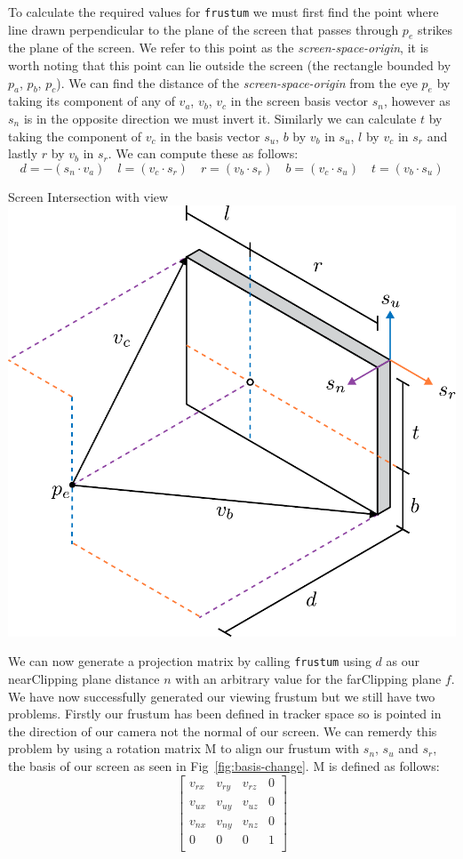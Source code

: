 To calculate the required values for \texttt{frustum} we must first find the point where line drawn perpendicular to the plane of the screen that passes through $p_e$ strikes the plane of the screen. We refer to this point as the {\it screen-space-origin}, it is worth noting that this point can lie outside the screen (the rectangle bounded by $p_a$, $p_b$, $p_c$). We can find the distance of the {\it screen-space-origin} from the eye $p_e$ by taking its component of any of $v_a$, $v_b$, $v_c$ in the screen basis vector $s_n$, however as $s_n$ is in the opposite direction we must invert it. Similarly we can calculate $t$ by taking the component of $v_c$ in the basis vector $s_u$, $b$ by $v_b$ in $s_u$, $l$ by $v_c$ in $s_r$ and lastly $r$ by $v_b$ in $s_r$. We can compute these as follows:
\[ d= -(s_n \cdot v_a) \quad l = (v_c \cdot s_r) \quad r = (v_b \cdot s_r) \quad b = (v_c \cdot s_u) \quad t = (v_b \cdot s_u) \]

\begin{figureBox}[label={fig:screen-extents}, width=0.8\linewidth]{Screen Intersection with view}
    \includegraphics[width = 0.5\linewidth]{./background/figures/projection/eye-projection.pdf}
\end{figureBox}

We can now generate a projection matrix by calling \texttt{frustum} using $d$ as our nearClipping plane distance $n$ with an arbitrary value for the farClipping plane $f$. We have now successfully generated our viewing frustum but we still have two problems. Firstly our frustum has been defined in tracker space so is pointed in the direction of our camera not the normal of our screen. We can remerdy this problem by using a rotation matrix M to align our frustum with $s_n$, $s_u$ and $s_r$, the basis of our screen as seen in Fig~\ref{fig:basis-change}. M is defined as follows:
\[
    \begin{bmatrix}
        v_{rx} & v_{ry} & v_{rz} & 0 \\
        v_{ux} & v_{uy} & v_{uz} & 0 \\
        v_{nx} & v_{ny} & v_{nz} & 0 \\
        0      & 0      & 0      & 1 \\
    \end{bmatrix}
\]

